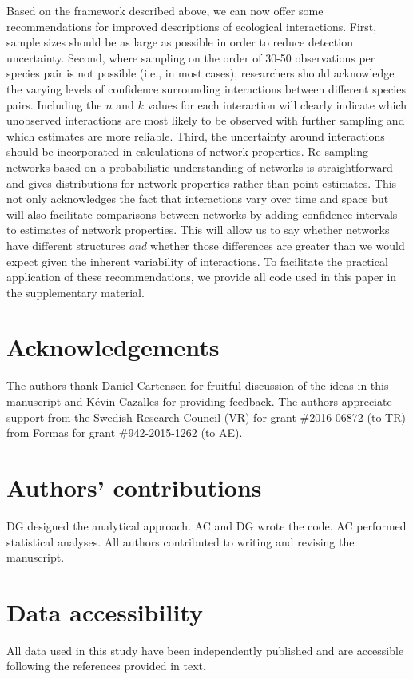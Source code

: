 \documentclass[12pt]{article}
\begin{document}
\begin{spacing}{2.0}
  Based on the framework described above, we can now offer some recommendations for improved descriptions of ecological interactions. First, sample sizes should be as large as possible in order to reduce detection uncertainty. Second, where sampling on the order of 30-50 observations per species pair is not possible (i.e., in most cases), researchers should acknowledge the varying levels of confidence surrounding interactions between different species pairs. Including the $n$ and $k$ values for each interaction will clearly indicate which unobserved interactions are most likely to be observed with further sampling and which estimates are more reliable. Third, the uncertainty around interactions should be incorporated in calculations of network properties. Re-sampling networks based on a probabilistic understanding of networks is straightforward and gives distributions for network properties rather than point estimates. This not only acknowledges the fact that interactions vary over time and space but will also facilitate comparisons between networks by adding confidence intervals to estimates of network properties. This will allow us to say whether networks have different structures \emph{and} whether those differences are greater than we would expect given the inherent variability of interactions. To facilitate the practical application of these recommendations, we provide all code used in this paper in the supplementary material. 


\section*{Acknowledgements}

  The authors thank Daniel Cartensen for fruitful discussion of the ideas in this manuscript and K\'{e}vin Cazalles for providing feedback. The authors appreciate support from the Swedish Research Council (VR) for grant \#2016-06872 (to TR) from Formas for grant \#942-2015-1262 (to AE).


\section*{Authors' contributions}

DG designed the analytical approach. AC and DG wrote the code. AC performed statistical analyses. All authors contributed to writing and revising the manuscript.


\section*{Data accessibility}

All data used in this study have been independently published and are accessible following the references provided in text.



\end{spacing}
\clearpage
\end{document}
